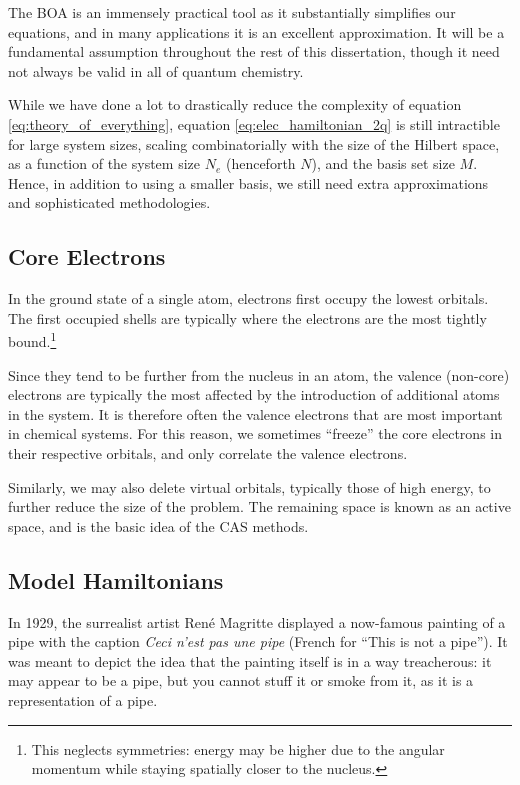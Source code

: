 The \gls{BOA} is an immensely practical tool as it substantially simplifies our equations, and in many applications it is an excellent approximation. It will be a fundamental assumption throughout the rest of this dissertation, though it need not always be valid in all of quantum chemistry.

While we have done a lot to drastically reduce the complexity of equation \eqref{eq:theory_of_everything}, equation \eqref{eq:elec_hamiltonian_2q} is still intractible for large system sizes, scaling combinatorially with the size of the Hilbert space, as a function of the system size $N_e$ (henceforth $N$), and the basis set size $M$. Hence, in addition to using a smaller basis, we still need extra approximations and sophisticated methodologies.


\subsection{Core Electrons}
\label{sec:core_electrons}

In the ground state of a single atom, electrons first occupy the lowest orbitals. The first occupied shells are typically where the electrons are the most tightly bound.\footnote{This neglects symmetries: energy may be higher due to the angular momentum while staying spatially closer to the nucleus.}

Since they tend to be further from the nucleus in an atom, the valence (non-core) electrons are typically the most affected by the introduction of additional atoms in the system. It is therefore often the valence electrons that are most important in chemical systems. For this reason, we sometimes ``freeze'' the core electrons in their respective orbitals, and only correlate the valence electrons.

Similarly, we may also delete virtual orbitals, typically those of high energy, to further reduce the size of the problem. The remaining space is known as an active space, and is the basic idea of the \gls{CAS} methods.

\subsection{Model Hamiltonians}

In 1929, the surrealist artist Ren\'e Magritte displayed a now-famous painting of a pipe with the caption \emph{Ceci n'est pas une pipe} (French for ``This is not a pipe''). It was meant to depict the idea that the painting itself is in a way treacherous: it may appear to be a pipe, but you cannot stuff it or smoke from it, as it is a representation of a pipe.


